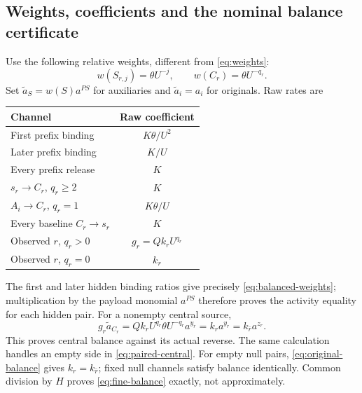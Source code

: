 \documentclass[11pt,reqno]{amsart}
\theoremstyle{definition}
\theoremstyle{remark}
\begin{document}
\subsection{Weights, coefficients and the nominal balance certificate}
Use the following relative weights, different from \eqref{eq:weights}:
\begin{equation}\label{eq:balanced-weights}
 w(S_{r,j})=\theta U^{-j},\qquad w(C_r)=\theta U^{-q_r}.
\end{equation}
Set $\widetilde a_S=w(S)a^{PS}$ for auxiliaries and
$\widetilde a_i=a_i$ for originals. Raw rates are
\begin{center}\small
\begin{tabular}{lc}
\toprule
Channel & Raw coefficient\\\midrule
First prefix binding & $K\theta/U^2$\\
Later prefix binding & $K/U$\\
Every prefix release & $K$\\
$s_r\to C_r$, $q_r\ge2$ & $K$\\
$A_i\to C_r$, $q_r=1$ & $K\theta/U$\\
Every baseline $C_r\to s_r$ & $K$\\
Observed $r$, $q_r>0$ & $g_r=Qk_rU^{q_r}$\\
Observed $r$, $q_r=0$ & $k_r$\\\bottomrule
\end{tabular}
\end{center}
The first and later hidden binding ratios give precisely
\eqref{eq:balanced-weights}; multiplication by the payload monomial $a^{PS}$
therefore proves the activity equality for each hidden pair. For a nonempty
central source,
\begin{equation}\label{eq:central-balance-calc}
 g_r\widetilde a_{C_r}
 =Qk_rU^{q_r}\theta U^{-q_r}a^{y_r}
 =k_ra^{y_r}=k_{\bar r}a^{z_r}.
\end{equation}
This proves central balance against its actual reverse. The same calculation
handles an empty side in \eqref{eq:paired-central}. For empty null pairs,
\eqref{eq:original-balance} gives $k_r=k_{\bar r}$; fixed null channels
satisfy balance identically. Common division by $H$ proves
\eqref{eq:fine-balance} exactly, not approximately.
\end{document}

